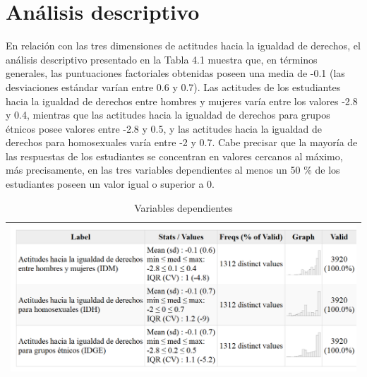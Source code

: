\documentclass[12pt,twoside]{templates/facsothesis}
\begin{document}
\hypertarget{anuxe1lisis-descriptivo}{%
\section{Análisis descriptivo}\label{anuxe1lisis-descriptivo}}

En relación con las tres dimensiones de actitudes hacia la igualdad de derechos, el análisis descriptivo presentado en la Tabla 4.1 muestra que, en términos generales, las puntuaciones factoriales obtenidas poseen una media de -0.1 (las desviaciones estándar varían entre 0.6 y 0.7). Las actitudes de los estudiantes hacia la igualdad de derechos entre hombres y mujeres varía entre los valores -2.8 y 0.4, mientras que las actitudes hacia la igualdad de derechos para grupos étnicos posee valores entre -2.8 y 0.5, y las actitudes hacia la igualdad de derechos para homosexuales varía entre -2 y 0.7. Cabe precisar que la mayoría de las respuestas de los estudiantes se concentran en valores cercanos al máximo, más precisamente, en las tres variables dependientes al menos un 50 \% de los estudiantes poseen un valor igual o superior a 0.

\begin{longtable}[]{@{}l@{}}
\caption{\label{tab:unnamed-chunk-6}Variables dependientes}\tabularnewline
\toprule
\endhead
\includegraphics[width=\textwidth,height=0.5\textheight]{input/images/desc01_dep.png} \\
\bottomrule
\end{longtable}
\end{document}
